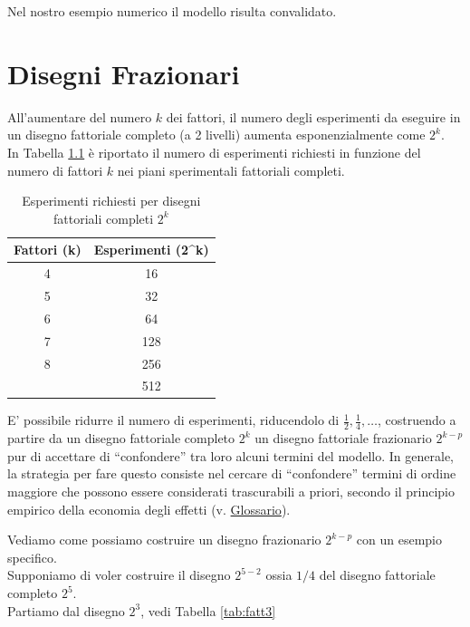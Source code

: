 \documentclass[
  11pt,
]{book}
\begin{document}
Nel nostro esempio numerico il modello risulta convalidato.

\hypertarget{disegni-frazionari}{%
\chapter{Disegni Frazionari}\label{disegni-frazionari}}

All'aumentare del numero \(k\) dei fattori, il numero degli esperimenti da eseguire in un disegno fattoriale completo (a 2 livelli) aumenta esponenzialmente come \(2^k\).\\
In Tabella \ref{tab:exprich} è riportato il numero di esperimenti richiesti in funzione del numero di fattori \(k\) nei piani sperimentali fattoriali completi.

\begin{table}

\caption{\label{tab:exprich}Esperimenti richiesti per disegni fattoriali completi $2^k$}
\centering
\begin{tabular}[t]{cc}
\toprule
Fattori (k) & Esperimenti (2\textasciicircum{}k)\\
\midrule
4 & 16\\
5 & 32\\
6 & 64\\
7 & 128\\
8 & 256\\
\addlinespace
9 & 512\\
\bottomrule
\end{tabular}
\end{table}

E' possibile ridurre il numero di esperimenti, riducendolo di \(\frac{1}{2},\frac{1}{4}, \dots\), costruendo a partire da un disegno fattoriale completo \(2^k\) un disegno fattoriale frazionario \(2^{k-p}\) pur di accettare di ``confondere'' tra loro alcuni termini del modello. In generale, la strategia per fare questo consiste nel cercare di ``confondere'' termini di ordine maggiore che possono essere considerati trascurabili a priori, secondo il principio empirico della economia degli effetti (v. \protect\hyperlink{glossario}{Glossario}).

Vediamo come possiamo costruire un disegno frazionario \(2^{k-p}\) con un esempio specifico.\\
Supponiamo di voler costruire il disegno \(2^{5-2}\) ossia \(1/4\) del disegno fattoriale completo \(2^5\).\\
Partiamo dal disegno \(2^3\), vedi Tabella \ref{tab:fatt3}
\end{document}
